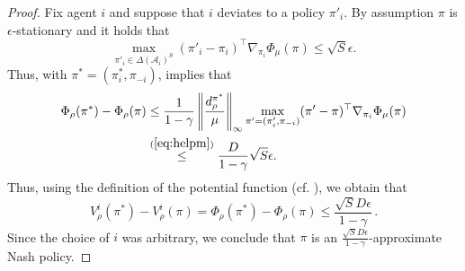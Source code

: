 \begin{proof}
Fix agent $i$ and suppose that $i$ deviates to a policy $\pi'_i$. By assumption $\pi$ is $\epsilon$-stationary and it holds that 
\begin{equation}
\max_{\pi'_i \in \Delta(\mathcal{A}_i)^S}(\pi'_i - \pi_i)^{\top} \nabla_{\pi_i} \Phi_{\mu}(\pi) \leq \sqrt{S}\epsilon.
\end{equation}
Thus, with $\pi^* = (\pi^*_i,\pi_{-i})$,  implies that
\begin{equation}\label{eq:almost}
\begin{split}
\Phi_{\rho}(\pi^*)-\Phi_{\rho}(\pi)&\le \frac{1}{1-\gamma}\left \|\frac{d^{\pi^*}_\rho}{\mu}\right\|_{\infty}\max_{\pi'=(\pi'_i,\pi_{-i})}(\pi'-\pi)^\top \nabla_{\pi_i}\Phi_{\mu}(\pi)
\\&\stackrel{(\ref{eq:helpm})}{\leq}\frac{D}{1-\gamma}\sqrt{S}\epsilon.
\end{split}
\end{equation}
Thus, using the definition of the potential function (cf. ), we obtain that
\[
V^i_{\rho}(\pi^*)-V^i_{\rho}(\pi) =\Phi_{\rho}(\pi^*)-\Phi_{\rho}(\pi) \leq \frac{\sqrt{S}D \epsilon}{1-\gamma}\,.
\]
Since the choice of $i$ was arbitrary, we conclude that $\pi$ is an $\frac{\sqrt{S}D \epsilon}{1-\gamma}$-approximate Nash policy.

\end{proof} 